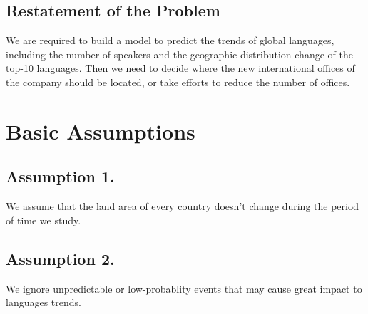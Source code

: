 \documentclass{mcmthesis}
\begin{document}
\subsection{Restatement of the Problem}
  \indent \indent We are required to build a model to predict the trends of global languages, including the number of speakers and the geographic distribution change of the top-10 languages. Then we need to decide where the new international offices of the company should be located, or take efforts to reduce the number of offices.



\section{Basic Assumptions}
\subsection{Assumption 1.}

  \indent \indent We assume that the land area of every country doesn't change during the period of time we study.

\subsection{Assumption 2.}

  \indent \indent We ignore unpredictable or low-probablity events that may cause great impact to languages trends.
 


\end{document}
